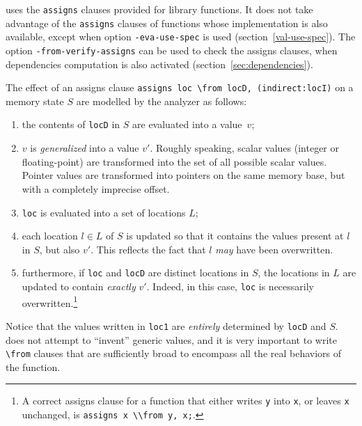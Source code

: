 \documentclass{frama-c-book}
\begin{document}
\Eva{} uses the \lstinline|assigns| clauses provided for
library functions. It does not take advantage of the
\lstinline|assigns| clauses of functions whose implementation is also
available, except when option \lstinline|-eva-use-spec| is used
(section~\ref{val-use-spec}). The option
\lstinline|-from-verify-assigns| can be used to check the assigns
clauses, when dependencies computation is also activated
(section~\ref{sec:dependencies}).



The effect of an assigns clause
\lstinline|assigns loc \from locD, (indirect:locI)| on a memory state $S$
are modelled by the analyzer as follows:
\begin{enumerate}
\item the contents of \lstinline|locD| in $S$ are evaluated into a value~$v$;

\item $v$ is \emph{generalized} into a value $v'$. Roughly speaking, scalar
  values (integer or floating-point) are transformed into the set of all
  possible scalar values. Pointer values are transformed into pointers on
  the same memory base, but with a completely imprecise offset.

\item \lstinline|loc| is evaluated into a set of locations $L$;

\item each location $l \in L$ of $S$ is updated so that it contains
  the values present at $l$ in $S$, but also $v'$. This reflects the
  fact that $l$ \emph{may} have been overwritten.

\item furthermore, if \lstinline|loc| and \lstinline|locD| are
  distinct locations in $S$, the locations in $L$ are updated to
  contain \emph{exactly} $v'$. Indeed, in this case, \lstinline|loc| is
  necessarily overwritten.\footnote{A correct assigns clause for a function
    that either writes \lstinline|y| into \lstinline|x|, or leaves
    \lstinline|x| unchanged, is \lstinline|assigns x \\from y, x;|.}

\end{enumerate}
Notice that the values written in \lstinline|loc1| are \emph{entirely}
determined by \lstinline|locD| and $S$. \Eva{} does not attempt
to ``invent'' generic values, and it is very important to write
\lstinline|\from| clauses that are sufficiently broad to encompass all
the real behaviors of the function.
\end{document}
